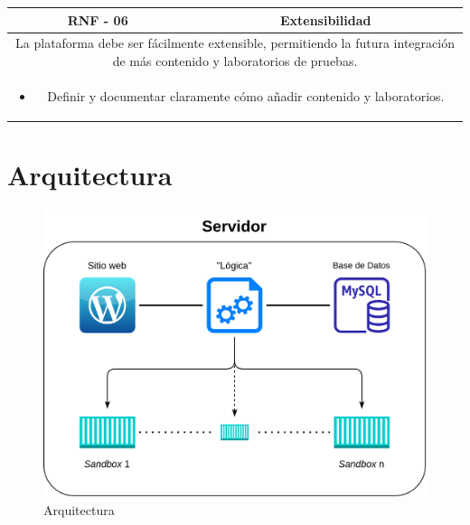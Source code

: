             \begin{table}[H]
                \centering
                \begin{tabular}{|c|c|}
                    \hline
                    \textbf{RNF - 06} & \textbf{Extensibilidad} \\
                    \hline
                    \multicolumn{2}{|p{15cm}|}{
                        La plataforma debe ser fácilmente extensible, permitiendo la futura integración de más contenido y laboratorios de pruebas.
                    } \\
                    \hline
                    \multicolumn{2}{|p{15cm}|}{
                        \begin{itemize}
                            \item Definir y documentar claramente cómo añadir contenido y laboratorios.
                        \end{itemize}
                        } \\
                    \hline
                \end{tabular}
                \label{tab:RNF6}
            \end{table}
            
            \cleardoublepage
    
    
    \section{Arquitectura}
        \label{sec:arquitectura}
        
        \begin{figure}[h]
            \centering
            \includegraphics[scale=0.20]{images/Diagramas/Arquitectura.png}
            \caption{Arquitectura}
            \label{fig:arquitectura}
        \end{figure}

